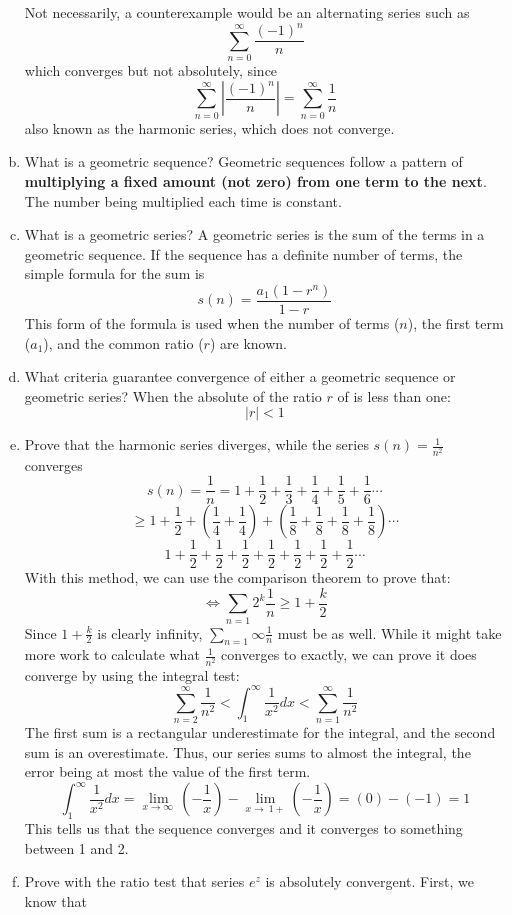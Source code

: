 \documentclass{article}
\begin{document}
\begin{enumerate}[a.]
	Not necessarily, a counterexample would be an alternating series such as
	\[\sum_{n=0}^{\infty}\frac{(-1)^n}{n}\]
	which converges but not absolutely, since
	\[\sum_{n=0}^{\infty}|\frac{(-1)^n}{n}| = \sum_{n=0}^{\infty}\frac{1}{n}\]
	also known as the harmonic series, which does not converge.
	\item What is a geometric sequence?
	Geometric sequences follow a pattern of \textbf{multiplying a fixed amount (not zero) from one term to the next}. The number being multiplied each time is constant.
	\item What is a geometric series?
	A geometric series is the sum of the terms in a geometric sequence. If the sequence has a definite number of terms, the simple formula for the sum is
    \[s(n) = \frac{a_1(1-r^n)}{1-r}\]
    This form of the formula is used when the number of terms ($n$), the first term ($a_1$), and the common ratio ($r$) are known.
	\item What criteria guarantee convergence of either a geometric sequence or geometric series?
	When the absolute of the ratio $r$ of is less than one:
	\[|r| < 1\]
	\item Prove that the harmonic series diverges, while the series $s(n) = \frac{1}{n^2} $ converges
	\[s(n) = \frac{1}{n} = 1+\frac{1}{2}+\frac{1}{3}+\frac{1}{4}+\frac{1}{5}+\frac{1}{6}\cdots\]
	\[\geq 1+\frac{1}{2}+(\frac{1}{4}+\frac{1}{4})+(\frac{1}{8}+\frac{1}{8}+\frac{1}{8}+\frac{1}{8})\cdots\]
	\[1+\frac{1}{2}+\frac{1}{2}+\frac{1}{2}+\frac{1}{2}+\frac{1}{2}+\frac{1}{2}+\frac{1}{2}\cdots\]
	With this method, we can use the comparison theorem to prove that:
	\[\iff \sum_{n=1}{2^k}\frac{1}{n}\geq 1+\frac{k}{2}\]
	Since $1+\frac{k}{2}$ is clearly infinity, $\sum_{n=1}{\infty}\frac{1}{n}$ must be as well.
	While it might take more work to calculate what $\frac{1}{n^2}$ converges to exactly, we can prove it does converge by using the integral test:
	\[\sum_{n=2}^{\infty}\frac{1}{n^2}<\int_{1}^{\infty}\frac{1}{x^2}dx<\sum_{n=1}^{\infty}\frac{1}{n^2}\]
	The first sum is a rectangular underestimate for the integral, and the second sum is an overestimate. Thus, our series sums to almost the integral, the error being at most the value of the first term.
	\[\int_{1}^{\infty}\frac{1}{x^2}dx = \lim _{x\to \infty \:}\left(-\frac{1}{x}\right)- \lim _{x\to \:1+}\left(-\frac{1}{x}\right) = (0)-(-1) = 1\]
	This tells us that the sequence converges and it converges to something between 1 and 2.
	\item Prove with the ratio test that series $e^z$ is absolutely convergent.
	First, we know that

\end{enumerate}
\end{document}
